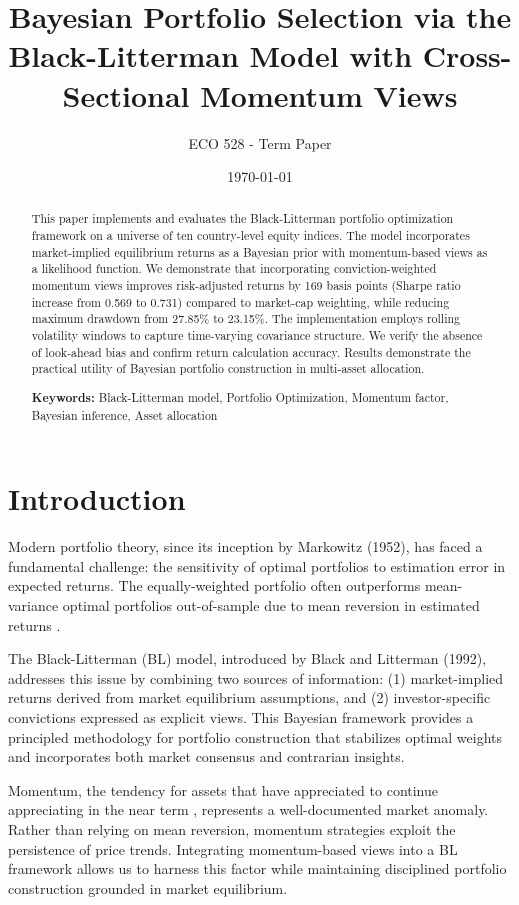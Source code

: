 \documentclass[12pt,a4paper]{article}
\title{\textbf{Bayesian Portfolio Selection via the Black-Litterman Model with Cross-Sectional Momentum Views}}
\author{ECO 528 - Term Paper}
\date{\today}
\begin{document}
\maketitle

\begin{abstract}
This paper implements and evaluates the Black-Litterman portfolio optimization framework on a universe of ten country-level equity indices. The model incorporates market-implied equilibrium returns as a Bayesian prior with momentum-based views as a likelihood function. We demonstrate that incorporating conviction-weighted momentum views improves risk-adjusted returns by 169 basis points (Sharpe ratio increase from 0.569 to 0.731) compared to market-cap weighting, while reducing maximum drawdown from 27.85\% to 23.15\%. The implementation employs rolling volatility windows to capture time-varying covariance structure. We verify the absence of look-ahead bias and confirm return calculation accuracy. Results demonstrate the practical utility of Bayesian portfolio construction in multi-asset allocation.

\vspace{0.5cm}
\noindent \textbf{Keywords:} Black-Litterman model, Portfolio Optimization, Momentum factor, Bayesian inference, Asset allocation
\end{abstract}

\newpage
\tableofcontents
\newpage

\section{Introduction}

Modern portfolio theory, since its inception by Markowitz (1952), has faced a fundamental challenge: the sensitivity of optimal portfolios to estimation error in expected returns. The equally-weighted portfolio often outperforms mean-variance optimal portfolios out-of-sample due to mean reversion in estimated returns \citep{demiguel2009}. 

The Black-Litterman (BL) model, introduced by Black and Litterman (1992), addresses this issue by combining two sources of information: (1) market-implied returns derived from market equilibrium assumptions, and (2) investor-specific convictions expressed as explicit views. This Bayesian framework provides a principled methodology for portfolio construction that stabilizes optimal weights and incorporates both market consensus and contrarian insights.

Momentum, the tendency for assets that have appreciated to continue appreciating in the near term \citep{jegadeesh1993}, represents a well-documented market anomaly. Rather than relying on mean reversion, momentum strategies exploit the persistence of price trends. Integrating momentum-based views into a BL framework allows us to harness this factor while maintaining disciplined portfolio construction grounded in market equilibrium.
\end{document}
